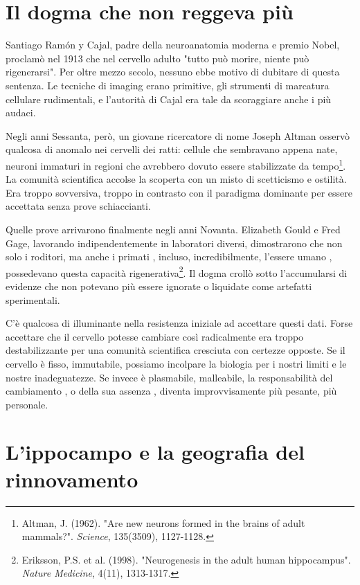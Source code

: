 \section{Il dogma che non reggeva più}

Santiago Ramón y Cajal, padre della neuroanatomia moderna e premio Nobel, proclamò nel 1913 che nel cervello adulto "tutto può morire, niente può rigenerarsi". Per oltre mezzo secolo, nessuno ebbe motivo di dubitare di questa sentenza. Le tecniche di imaging erano primitive, gli strumenti di marcatura cellulare rudimentali, e l'autorità di Cajal era tale da scoraggiare anche i più audaci.

Negli anni Sessanta, però, un giovane ricercatore di nome Joseph Altman osservò qualcosa di anomalo nei cervelli dei ratti: cellule che sembravano appena nate, neuroni immaturi in regioni che avrebbero dovuto essere stabilizzate da tempo\footnote{Altman, J. (1962). "Are new neurons formed in the brains of adult mammals?". \textit{Science}, 135(3509), 1127-1128.}. La comunità scientifica accolse la scoperta con un misto di scetticismo e ostilità. Era troppo sovversiva, troppo in contrasto con il paradigma dominante per essere accettata senza prove schiaccianti.

Quelle prove arrivarono finalmente negli anni Novanta. Elizabeth Gould e Fred Gage, lavorando indipendentemente in laboratori diversi, dimostrarono che non solo i roditori, ma anche i primati , incluso, incredibilmente, l'essere umano , possedevano questa capacità rigenerativa\footnote{Eriksson, P.S. et al. (1998). "Neurogenesis in the adult human hippocampus". \textit{Nature Medicine}, 4(11), 1313-1317.}. Il dogma crollò sotto l'accumularsi di evidenze che non potevano più essere ignorate o liquidate come artefatti sperimentali.

C'è qualcosa di illuminante nella resistenza iniziale ad accettare questi dati. Forse accettare che il cervello potesse cambiare così radicalmente era troppo destabilizzante per una comunità scientifica cresciuta con certezze opposte. Se il cervello è fisso, immutabile, possiamo incolpare la biologia per i nostri limiti e le nostre inadeguatezze. Se invece è plasmabile, malleabile, la responsabilità del cambiamento , o della sua assenza , diventa improvvisamente più pesante, più personale.

\section{L'ippocampo e la geografia del rinnovamento}

